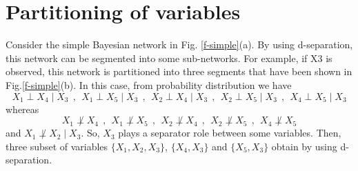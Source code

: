 \documentclass{article}
\begin{document}
\section{Partitioning of variables}
Consider the simple Bayesian network in Fig. \ref{f-simple}(a). By using d-separation, this network can be segmented into some sub-networks. For example, if X3 is observed, this network is partitioned into three segments that have been shown in Fig.\ref{f-simple}(b). In this case, from probability distribution we have
\begin{equation*}
    X_1 \perp X_4 \mid X_3~~,~~X_1 \perp X_5 \mid X_3~~,~~X_2 \perp X_4 \mid X_3~~,~~X_2 \perp X_5 \mid X_3~~,~~X_4 \perp X_5 \mid X_3
\end{equation*}
whereas 
\begin{equation*}
    X_1 \not\perp X_4~~, ~~X_1\not \perp X_5~~, ~~X_2 \not\perp X_4~~, ~~X_2\not \perp X_5~~, ~~X_4\not \perp X_5
\end{equation*}
and $X_1\not \perp X_2 \mid X_3$. So, $X_3$ plays a separator role between some variables. Then, three subset of variables $\{X_1,X_2,X_3\}$, $\{X_4,X_3\}$ and $\{X_5,X_3\}$ obtain by using d-separation. 
\end{document}
